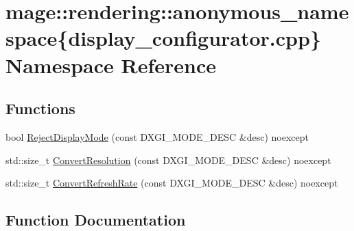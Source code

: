 \hypertarget{namespacemage_1_1rendering_1_1anonymous__namespace_02display__configurator_8cpp_03}{}\section{mage\+:\+:rendering\+:\+:anonymous\+\_\+namespace\{display\+\_\+configurator.\+cpp\} Namespace Reference}
\label{namespacemage_1_1rendering_1_1anonymous__namespace_02display__configurator_8cpp_03}
\subsection*{Functions}
\begin{DoxyCompactItemize}
\item 
bool \mbox{\hyperlink{namespacemage_1_1rendering_1_1anonymous__namespace_02display__configurator_8cpp_03_adcb562662bd203427f9c0fe08912e491}{Reject\+Display\+Mode}} (const D\+X\+G\+I\+\_\+\+M\+O\+D\+E\+\_\+\+D\+E\+SC \&desc) noexcept
\item 
std\+::size\+\_\+t \mbox{\hyperlink{namespacemage_1_1rendering_1_1anonymous__namespace_02display__configurator_8cpp_03_a0cb1426e2dba7938d75a2f9ec1e9e0a6}{Convert\+Resolution}} (const D\+X\+G\+I\+\_\+\+M\+O\+D\+E\+\_\+\+D\+E\+SC \&desc) noexcept
\item 
std\+::size\+\_\+t \mbox{\hyperlink{namespacemage_1_1rendering_1_1anonymous__namespace_02display__configurator_8cpp_03_a64ac9b05dcf0ff1704c80a8d8a87bde8}{Convert\+Refresh\+Rate}} (const D\+X\+G\+I\+\_\+\+M\+O\+D\+E\+\_\+\+D\+E\+SC \&desc) noexcept
\end{DoxyCompactItemize}


\subsection{Function Documentation}
\mbox{\label{namespacemage_1_1rendering_1_1anonymous__namespace_02display__configurator_8cpp_03_a64ac9b05dcf0ff1704c80a8d8a87bde8}} 
